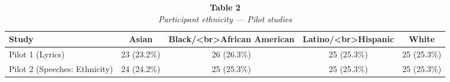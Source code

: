 \begin{table}
\caption*{
{\large \textbf{Table 2}} \\ 
{\small \emph{Participant ethnicity --- Pilot studies}}
} 
\fontsize{9.0pt}{10.8pt}\selectfont
\begin{tabular*}{\linewidth}{@{\extracolsep{\fill}}lcccc}
\toprule
Study & Asian & Black/<br>African American & Latino/<br>Hispanic & White \\ 
\midrule\addlinespace[2.5pt]
Pilot 1 (Lyrics) & 23 (23.2\%) & 26 (26.3\%) & 25 (25.3\%) & 25 (25.3\%) \\ 
Pilot 2 (Speeches: Ethnicity) & 24 (24.2\%) & 25 (25.3\%) & 25 (25.3\%) & 25 (25.3\%) \\ 
\bottomrule
\end{tabular*}
\end{table}


